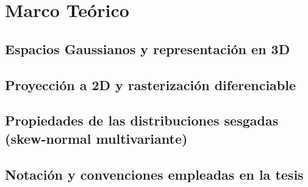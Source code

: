 \chapter{Marco Teórico}\label{chapter:theory}

\section{Espacios Gaussianos y representación en 3D}
\section{Proyección a 2D y rasterización diferenciable}
\section{Propiedades de las distribuciones sesgadas (skew-normal multivariante)}
\section{Notación y convenciones empleadas en la tesis}